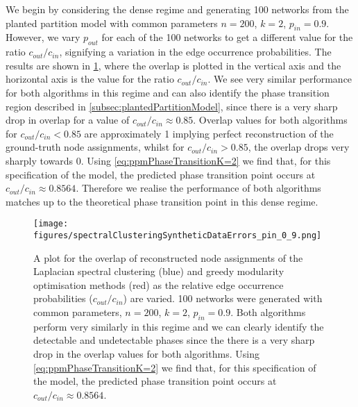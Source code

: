We begin by considering the dense regime and generating 100 networks from the planted partition model with common parameters $n=200$, $k=2$, $p_{in}=0.9$.
However, we vary $p_{out}$ for each of the 100 networks to get a different value for the ratio $c_{out}/c_{in}$, signifying a variation in the edge occurrence probabilities.
The results are shown in \cref{fig:syntheticDataResultsPin0.9}, where the overlap is plotted in the vertical axis and the horizontal axis is the value for the ratio $c_{out}/c_{in}$.
We see very similar performance for both algorithms in this regime and can also identify the phase transition region described in \cref{subsec:plantedPartitionModel}, since there is a very sharp drop in overlap for a value of $c_{out}/c_{in} \approx 0.85$.
Overlap values for both algorithms for $c_{out}/c_{in} < 0.85$ are approximately 1 implying perfect reconstruction of the ground-truth node assignments, whilst for $c_{out}/c_{in} > 0.85$, the overlap drops very sharply towards 0.
Using \cref{eq:ppmPhaseTransitionK=2} we find that, for this specification of the model, the predicted phase transition point occurs at $c_{out}/c_{in} \approx 0.8564$.
Therefore we realise the performance of both algorithms matches up to the theoretical phase transition point in this dense regime.

\begin{figure}
	\centering
	\texttt{[image: figures/spectralClusteringSyntheticDataErrors\_pin\_0\_9.png]}
	\caption[Plot of overlap for spectral clustering and modularity methods in the dense regime.]{\label{fig:syntheticDataResultsPin0.9} A plot for the overlap of reconstructed node assignments of the Laplacian spectral clustering (blue) and greedy modularity optimisation methods (red) as the relative edge occurrence probabilities ($c_{out}/c_{in}$) are varied. 100 networks were generated with common parameters, $n=200$, $k=2$, $p_{in}=0.9$. Both algorithms perform very similarly in this regime and we can clearly identify the detectable and undetectable phases since the there is a very sharp drop in the overlap values for both algorithms. Using \cref{eq:ppmPhaseTransitionK=2} we find that, for this specification of the model, the predicted phase transition point occurs at $c_{out}/c_{in} \approx 0.8564$.}
\end{figure}

